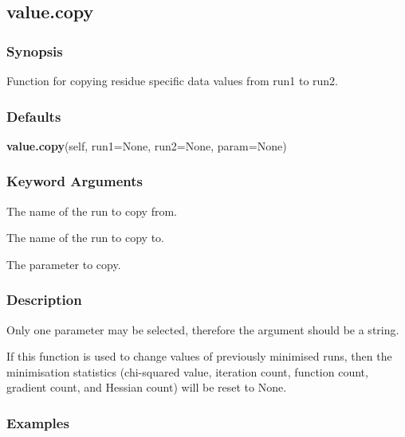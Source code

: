 
  

 \newpage 

 \subsection{value.copy} 

  
 \subsubsection{Synopsis} 

 Function for copying residue specific data values from run1 to run2. 
  

  
 \subsubsection{Defaults} 

 \textsf{\textbf{value.copy}(self, run1=None, run2=None, param=None)} 

  
 \subsubsection{Keyword Arguments} 

   The name of the run to copy from.   

   The name of the run to copy to.   

   The parameter to copy.  

  

  
 \subsubsection{Description} 

 Only one parameter may be selected, therefore the  argument should be a string. 
  

 If this function is used to change values of previously minimised runs, then the minimisation statistics (chi-squared value, iteration count, function count, gradient count, and Hessian count) will be reset to None. 
  

  
 \subsubsection{Examples} 

